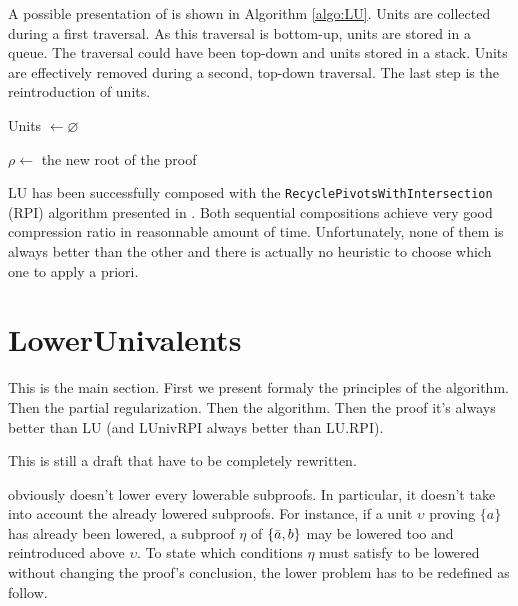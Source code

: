 \documentclass{llncs}
\begin{document}
A possible presentation of {\LowerUnits} is shown in Algorithm \ref{algo:LU}. Units are collected during a
first traversal. As this traversal is bottom-up, units are stored in a queue. The traversal could
have been top-down and units stored in a stack. Units are effectively removed during a second,
top-down traversal. The last step is the reintroduction of units.

\begin{algorithm}[bt]
  Units $\leftarrow \varnothing$ \;



  $\rho \leftarrow$ the new root of the proof \;

  \label{algo:LU}
  \caption{\LowerUnits}
\end{algorithm}

LU has been successfully composed with the \texttt{RecyclePivotsWithIntersection} (RPI) algorithm
presented in \cite{LURPI}. Both sequential compositions achieve very good compression ratio in
reasonnable amount of time. Unfortunately, none of them is always better than the other and there is
actually no heuristic to choose which one to apply a priori.

\section{LowerUnivalents}

\begin{jb}
This is the main section. First we present formaly the principles of the algorithm. Then the partial
regularization. Then the algorithm. Then the proof it's always better than LU (and LUnivRPI always
better than LU.RPI).

This is still a draft that have to be completely rewritten.
\end{jb}

{\LowerUnits} obviously doesn't lower every lowerable subproofs. In particular, it doesn't take into
account the already lowered subproofs. For instance, if a unit $\upsilon$ proving $\{a\}$ has
already been lowered, a subproof $\eta$ of $\{\bar{a},b\}$ may be lowered too and reintroduced
above $\upsilon$. To state which conditions $\eta$ must satisfy to be lowered without changing the
proof's conclusion, the lower problem has to be redefined as follow.
\end{document}
